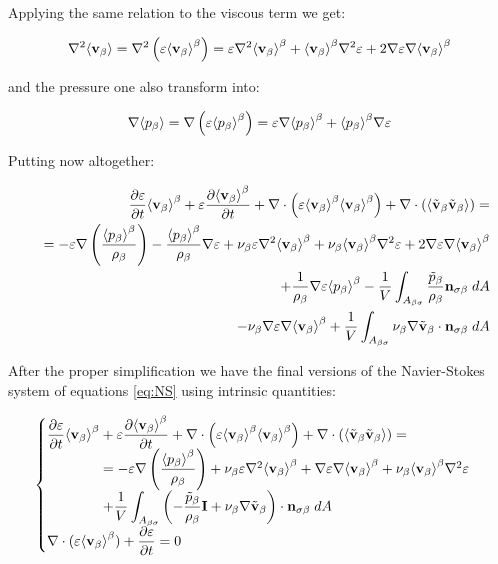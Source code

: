 Applying the same relation to the viscous term we get:

\begin{equation}
	\nabla^2 {\left< \textbf{v}_{\beta} \right>} = \nabla^2 \left( \varepsilon {\left< \textbf{v}_{\beta}\right>}^{\beta} \right) = \varepsilon \nabla^2 {\left< \textbf{v}_{\beta} \right>}^{\beta} + {\left< \textbf{v}_{\beta} \right>}^{\beta} \nabla^2 \varepsilon +2 \nabla \varepsilon \nabla {\left< \textbf{v}_{\beta}\right>}^{\beta}
\end{equation}

and the pressure one also transform into:

\begin{equation}
\nabla {\left< p_{\beta}\right>} = \nabla \left( \varepsilon {\left< p_{\beta}\right>}^{\beta} \right) = \varepsilon \nabla {\left< p_{\beta}\right>}^{\beta} + {\left< p_{\beta} \right>}^{\beta} \nabla \varepsilon
\end{equation}

Putting now altogether:

\begin{eqnarray}
&& \dfrac{\partial \varepsilon}{\partial t}{\left< \textbf{v}_{\beta} \right>}^{\beta} + \varepsilon \dfrac{\partial {\left< \textbf{v}_{\beta}\right>}^{\beta}}{\partial t} + \nabla \cdot \left(\varepsilon {\left< \textbf{v}_{\beta}\right>}^{\beta}{\left< \textbf{v}_{\beta} \right>}^{\beta}\right)   + \nabla \cdot \left({\left< \tilde{\textbf{v}}_{\beta} \tilde{\textbf{v}}_{\beta} \right>}\right) = \nonumber \\
&&= -\varepsilon \nabla \left(\dfrac{{\left< p_{\beta} \right>}^{\beta}}{\rho_{\beta}}\right) - \dfrac{{\left< p_{\beta} \right>}^{\beta}}{\rho_{\beta}} \nabla \varepsilon + \nu_{\beta} \varepsilon \nabla^2 {\left< \textbf{v}_{\beta} \right>}^{\beta} + \nu_{\beta} {\left< \textbf{v}_{\beta} \right>}^{\beta} \nabla^2 \varepsilon + 2 \nabla \varepsilon \nabla {\left< \textbf{v}_{\beta}\right>}^{\beta} \nonumber \\
&&+\dfrac{1}{\rho_{\beta}}\nabla\varepsilon {\left< p_{\beta}\right>}^{\beta} - \dfrac{1}{V} \int_{A_{\beta \sigma}} \dfrac{\tilde{p}_{\beta}}{\rho_{\beta}} \mathbf{n}_{\sigma \beta} \;dA \nonumber \\
&&- \nu_{\beta} \nabla \varepsilon \nabla {\left< \textbf{v}_{\beta}\right>}^{\beta} + \dfrac{1}{V} \int_{A_{\beta \sigma}} \nu_{\beta} \nabla \tilde{\textbf{v}}_{\beta} \cdot \mathbf{n}_{\sigma \beta} \;dA
\end{eqnarray}

After the proper simplification we have the final versions of the Navier-Stokes system of equations \eqref{eq:NS} using intrinsic quantities:

\begin{eqnarray}
\begin{cases}
 \derp{\varepsilon}{t}\meani{\vb} + \varepsilon \derp{\meani{\vb}}{t} + \nabla \cdot \left(\varepsilon \meani{\vb}\meani{\vb}\right)   + \nabla \cdot \left(\means{\vbt \vbt}\right) =  \\
\qquad \qquad = -\varepsilon \nabla \left(\dfrac{\meani{\pb}}{\rho_{\beta}}\right) + \nub \varepsilon \nabla^2 \meani{\vb} +  \nabla \varepsilon \nabla \meani{\vb} + \nub \meani{\vb} \nabla^2 \varepsilon  \\
\qquad \qquad + \dfrac{1}{V} \displaystyle\int_{A_{\beta \sigma}} \left(-\dfrac{\pbt}{\rho_{\beta}} \mathbf{I}  + \nub \nabla \vbt \right)\cdot \nbs \;dA \\
 \nabla \cdot (\varepsilon\meani{\vb} ) + \derp{\varepsilon}{t}= 0 
\end{cases}
\label{eq:vans_mom_1}
\end{eqnarray}


